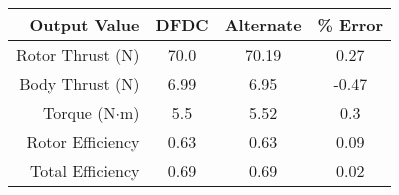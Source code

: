         \begin{tabular}{ r | c | c | c }
            Output Value & DFDC & Alternate & \% Error \\
            \hline
            Rotor Thrust (N) & 70.0 & 70.19 & 0.27 \\
            Body Thrust (N) & 6.99 & 6.95 & -0.47 \\
            Torque (N\(\cdot\)m) & 5.5 & 5.52 & 0.3 \\
            Rotor Efficiency & 0.63 & 0.63 & 0.09 \\
            Total Efficiency & 0.69 & 0.69 & 0.02 \\
        \end{tabular}
